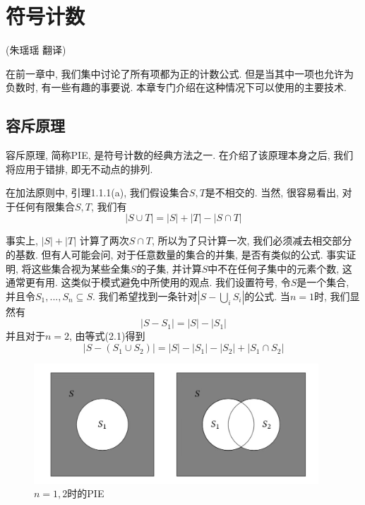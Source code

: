 \documentclass{ctexbook}
\begin{document}
\setcounter{chapter}{1}
\chapter{符号计数}

\begin{center}
    (朱瑶瑶 \quad  翻译)
\end{center}


	在前一章中, 我们集中讨论了所有项都为正的计数公式. 但是当其中一项也允许为负数时, 有一些有趣的事要说. 本章专门介绍在这种情况下可以使用的主要技术.

\section{容斥原理}
	容斥原理, 简称PIE, 是符号计数的经典方法之一. 在介绍了该原理本身之后, 我们将应用于错排, 即无不动点的排列.

	在加法原则中, 引理1.1.1(a), 我们假设集合$S, T$是不相交的. 当然, 很容易看出, 对于任何有限集合$S, T$, 我们有
\begin{equation}
|S \cup T|=|S|+|T|-|S \cap T|
\end{equation}
%
%
%

	事实上, $|S|+|T|$ 计算了两次$S \cap T$, 所以为了只计算一次, 我们必须减去相交部分的基数. 但有人可能会问, 对于任意数量的集合的并集, 是否有类似的公式. 事实证明, 将这些集合视为某些全集$S$的子集, 并计算$S$中不在任何子集中的元素个数, 这通常更有用. 这类似于模式避免中所使用的观点. 我们设置符号, 令$S$是一个集合, 并且令$S_{1},...,S_{n} \subseteq S$. 我们希望找到一条针对$|S-\bigcup _{i}S_{i}|$的公式. 当$n=1$时, 我们显然有
\[
	|S-S_{1}|=|S|-|S_{1}|
\]
	并且对于$n=2$, 由等式(2.1)得到
   $$	|S-(S_{1} \cup S_{2})|=|S|-|S_{1}|-|S_{2}|+|S_{1} \cap S_{2}|$$
\begin{figure}[htbp]
    \centering
    \includegraphics*[width=0.95\textwidth]{./fig2/1.jpg}
    \caption{$n=1,2$时的PIE}
\end{figure}
\end{document}
